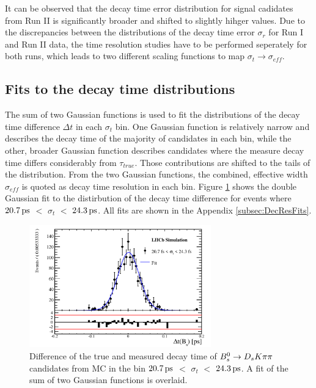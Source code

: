 It can be observed that the decay time error distribution for signal cadidates from Run II is significantly broader and shifted to slightly hihger values.
Due to the discrepancies between the distributions of the decay time error $\sigma_{r}$ for Run I and Run II data, the time resolution studies have to be performed seperately for both runs, 
which leads to two different scaling functions to map $\sigma_{t} \to \sigma_{eff}$. 


\subsection{Fits to the decay time distributions}

The sum of two Gaussian functions is used to fit the distributions of the decay time difference $\Delta t$ in each $\sigma_{t}$ bin.
One Gaussian function is relatively narrow and describes the decay time of the majority of candidates in each bin, 
while the other, broader Gaussian function describes candidates where the measure decay time differs considerably from $\tau_{true}$. 
Those contributions are shifted to the tails of the distribution. From the two Gaussian functions, the combined, effective width $\sigma_{eff}$ is quoted as decay time resolution in each bin. 
Figure \ref{fig:ResoFit_24to29} shows the double Gaussian fit to the distirbution of the decay time difference for events where $20.7{\mathrm{ \,ps}}$ $<$ $\sigma_{t}$ $<$ $24.3{\mathrm{ \,ps}}$. 
All fits are shown in the Appendix \ref{subsec:DecResFits}. \newline

\begin{figure}[h]
\centering
\includegraphics[height=!,width=0.7\textwidth]{figs/Resolution/SignalMC_bin_2.pdf}
\caption{Difference of the true and measured decay time of ${{B}^0_{s}}\rightarrow{\ensuremath{{D}_{s}}}{\ensuremath{K}}{\ensuremath{\pi}}{\ensuremath{\pi}}$ candidates from MC in the bin $20.7{\mathrm{ \,ps}}$ $<$ $\sigma_{t}$ $<$ $24.3{\mathrm{ \,ps}}$. A fit of the sum of two Gaussian functions is overlaid.}
\label{fig:ResoFit_24to29}
\end{figure}


